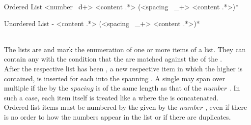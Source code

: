 \begin{identifier}{Ordered List}
<number ~d+> <content .*>
(<spacing ~_+> <content .*>)*
\end{identifier}
\begin{identifier}{Unordered List}
- <content .*>
(<spacing ~_+> <content .*>)*
\end{identifier}
 \\

The lists are  and mark the enumeration of one or more items of a list. They can contain any  with the condition that the  are matched against the  of the . \\

After the respective list  has been , a new respective item  in which the higher   is contained, is inserted for each  into the spanning . A single  may span over multiple  if the   by the \inline$spacing$  is of the same length as that of the \inline$number$ . In such a case, each item  itself is treated like a  where the  is concatenated. \\

Ordered list items must be numbered by the  given by the \inline$number$ , even if there is no order to how the numbers appear in the list or if there are duplicates. \\

